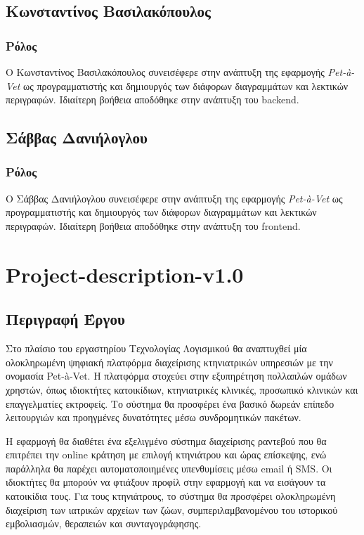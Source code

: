 \documentclass[12pt,a4paper,twoside]{book}
\begin{document}
\section{Κωνσταντίνος Βασιλακόπουλος}

\subsection{Ρόλος}

Ο Κωνσταντίνος Βασιλακόπουλος συνεισέφερε στην ανάπτυξη της εφαρμογής \textit{Pet-à-Vet} ως προγραμματιστής και δημιουργός των διάφορων διαγραμμάτων και λεκτικών περιγραφών. Ιδιαίτερη βοήθεια αποδόθηκε στην ανάπτυξη του backend. %

\section{Σάββας Δανιήλογλου}

\subsection{Ρόλος}

Ο Σάββας Δανιήλογλου συνεισέφερε στην ανάπτυξη της εφαρμογής \textit{Pet-à-Vet} ως προγραμματιστής και δημιουργός των διάφορων διαγραμμάτων και λεκτικών περιγραφών. Ιδιαίτερη βοήθεια αποδόθηκε στην ανάπτυξη του frontend. %

\chapter{Project-description-v1.0}

\section{Περιγραφή Έργου}

Στο πλαίσιο του εργαστηρίου Τεχνολογίας Λογισμικού θα αναπτυχθεί μία ολοκληρωμένη ψηφιακή πλατφόρμα διαχείρισης κτηνιατρικών υπηρεσιών με την ονομασία Pet-à-Vet. Η πλατφόρμα στοχεύει στην εξυπηρέτηση πολλαπλών ομάδων χρηστών, όπως ιδιοκτήτες κατοικίδιων, κτηνιατρικές κλινικές, προσωπικό κλινικών και επαγγελματίες εκτροφείς. Το σύστημα θα προσφέρει ένα βασικό δωρεάν επίπεδο λειτουργιών και προηγμένες δυνατότητες μέσω συνδρομητικών πακέτων. %

Η εφαρμογή θα διαθέτει ένα εξελιγμένο σύστημα διαχείρισης ραντεβού που θα επιτρέπει την online κράτηση με επιλογή κτηνιάτρου και ώρας επίσκεψης, ενώ παράλληλα θα παρέχει αυτοματοποιημένες υπενθυμίσεις μέσω email ή SMS. Οι ιδιοκτήτες θα μπορούν να φτιάξουν προφίλ στην εφαρμογή και να εισάγουν τα κατοικίδια τους. Για τους κτηνιάτρους, το σύστημα θα προσφέρει ολοκληρωμένη διαχείριση των ιατρικών αρχείων των ζώων, συμπεριλαμβανομένου του ιστορικού εμβολιασμών, θεραπειών και συνταγογράφησης.%
\end{document}
